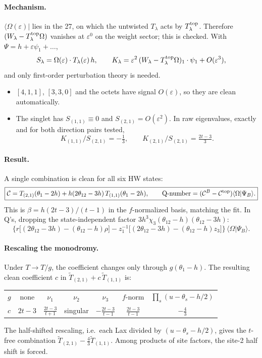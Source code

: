 \documentclass[11pt]{article}
\newcommand{\bra}[1]{\langle #1|}
\newcommand{\Om}{\Omega}
\newcommand{\eps}{\varepsilon}
\newcommand{\tw}{\theta_{12}}
\begin{document}
\paragraph{Mechanism.} $\bra{\Om(\eps)}$ lies in the 27, on which the untwisted $T_\lambda$ acts by $T^{\rm top}_\lambda$. Therefore $(W_\lambda-T^{\rm top}_\lambda\Om)$ vanishes at $\eps^0$ on the weight sector; this is checked. With $\Psi=h+\eps\psi_1+\dots$,
\[
S_\lambda=\Om(\eps)\cdot T_\lambda(\eps)\,h,\qquad K_\lambda=\eps^2\,(W_\lambda-T^{\rm top}_\lambda\Om)_1\cdot\psi_1+O(\eps^3),
\]
and only first-order perturbation theory is needed.
\begin{itemize}
\item $[4,1,1]$, $[3,3,0]$ and the octets have signal $O(\eps)$, so they are clean automatically.
\item The singlet has $S_{(1,1)}\equiv0$ and $S_{(2,1)}=O(\eps^2)$. In raw eigenvalues, exactly and for both direction pairs tested,
\[
K_{(1,1)}/S_{(2,1)}=-\tfrac13,\qquad K_{(2,1)}/S_{(2,1)}=\tfrac{2t-3}{3}.
\]
\end{itemize}

\paragraph{Result.} A single combination is clean for all six HW states:
\[
\boxed{\mathcal C=T_{(2,1)}(\theta_1-2h)+h(2\tw-3h)\,T_{(1,1)}(\theta_1-2h),\qquad\text{Q-number}=(\mathcal C^B-\mathcal C^{\rm top})\langle\Om|\Psi_B\rangle .}
\]
This is $\beta=h(2t-3)/(t-1)$ in the $f$-normalized basis, matching the fit. In Q's, dropping the state-independent factor $3h^3\chi_3(\tw-h)(\tw-3h)$:
\[
\Big\{r\big[(2\tw-3h)-(\tw-h)\rho\big]-z_1^{-1}\big[(2\tw-3h)-(\tw-h)z_3\big]\Big\}\,\langle\Om|\Psi_B\rangle .
\]

\paragraph{Rescaling the monodromy.} Under $T\to T/g$, the coefficient changes only through $g(\theta_1-h)$. The resulting clean coefficient $c$ in $\tilde T_{(2,1)}+c\,\tilde T_{(1,1)}$ is:
\begin{center}
\begin{tabular}{lcccccc}
\toprule
$g$ & none & $\nu_1$ & $\nu_2$ & $\nu_3$ & $f$-norm & $\prod_s(u-\theta_s-h/2)$\\
$c$ & $2t-3$ & $\frac{2t-3}{t+1}$ & singular & $-\frac{2t-3}{t-1}$ & $\frac{2t-3}{t-1}$ & $-\tfrac43$\\
\bottomrule
\end{tabular}
\end{center}
The half-shifted rescaling, i.e.\ each Lax divided by $(u-\theta_s-h/2)$, gives the $t$-free combination $\tilde T_{(2,1)}-\frac43\tilde T_{(1,1)}$. Among products of site factors, the site-2 half shift is forced.
\end{document}
